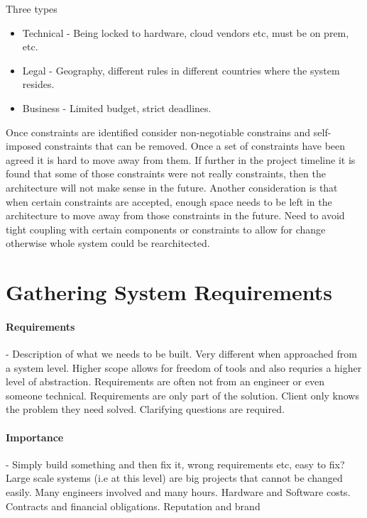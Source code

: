 \documentclass[a4paper, 11pt]{book}
\begin{document}
    Three types

    \begin{itemize}
        \item Technical - Being locked to hardware, cloud vendors etc, must be on prem, etc.
        \item Legal - Geography, different rules in different countries where the system resides.
        \item Business - Limited budget, strict deadlines.
    \end{itemize}

    Once constraints are identified consider non-negotiable constrains and self-imposed constraints that can be removed.
    Once a set of constraints have been agreed it is hard to move away from them.
    If further in the project timeline it is found that some of those constraints were not really constraints, then the architecture will not make sense in the future.
    Another consideration is that when certain constraints are accepted, enough space needs to be left in the architecture to move away from those constraints in the future.
    Need to avoid tight coupling with certain components or constraints to allow for change otherwise whole system could be rearchitected.


    \section{Gathering System Requirements}

    \paragraph{Requirements} - Description of what we needs to be built.
    Very different when approached from a system level.
    Higher scope allows for freedom of tools and also requries a higher level of abstraction.
    Requirements are often not from an engineer or even someone technical.
    Requirements are only part of the solution.
    Client only knows the problem they need solved.
    Clarifying questions are required.

    \paragraph{Importance} - Simply build something and then fix it, wrong requirements etc, easy to fix?
    Large scale systems (i.e at this level) are big projects that cannot be changed easily.
    Many engineers involved and many hours.
    Hardware and Software costs.
    Contracts and financial obligations.
    Reputation and brand
\end{document}
